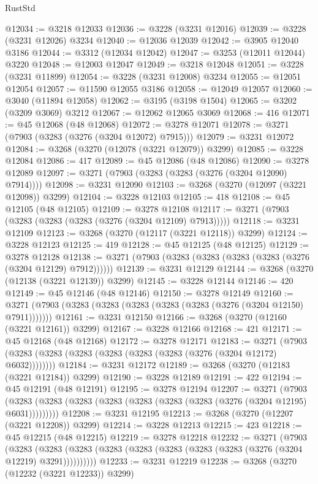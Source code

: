 \begin{lexlean}{RustStd}
\begin{coremodule}
@12034 := @3218 @12033
@12036 := @3228 (@3231 @12016)
@12039 := @3228 (@3231 @12026) @3234
@12040 := @12036 @12039
@12042 := @3905 @12040 @3186
@12044 := @3312 (@12034 @12042)
@12047 := @3253 (@12011 @12044) @3220
@12048 := @12003 @12047
@12049 := @3218 @12048
@12051 := @3228 (@3231 @11899)
@12054 := @3228 (@3231 @12008) @3234
@12055 := @12051 @12054
@12057 := @11590 @12055 @3186
@12058 := @12049 @12057
@12060 := @3040 (@11894 @12058)
@12062 := @3195 (@3198 @1504)
@12065 := @3202 (@3209 @3069) @3212
@12067 := @12062 @12065 @3069
@12068 := 416
@12071 := @45 @12068 (@48 @12068)
@12072 := @3278 @12071
@12078 := @3271 (@7903 (@3283 (@3276 (@3204 @12072) @7915)))
@12079 := @3231 @12072
@12084 := @3268 (@3270 (@12078 (@3221 @12079)) @3299)
@12085 := @3228 @12084
@12086 := 417
@12089 := @45 @12086 (@48 @12086)
@12090 := @3278 @12089
@12097 := @3271 (@7903 (@3283 (@3283 (@3276 (@3204 @12090) @7914))))
@12098 := @3231 @12090
@12103 := @3268 (@3270 (@12097 (@3221 @12098)) @3299)
@12104 := @3228 @12103
@12105 := 418
@12108 := @45 @12105 (@48 @12105)
@12109 := @3278 @12108
@12117 := @3271 (@7903 (@3283 (@3283 (@3283 (@3276 (@3204 @12109) @7913)))))
@12118 := @3231 @12109
@12123 := @3268 (@3270 (@12117 (@3221 @12118)) @3299)
@12124 := @3228 @12123
@12125 := 419
@12128 := @45 @12125 (@48 @12125)
@12129 := @3278 @12128
@12138 := @3271 (@7903 (@3283 (@3283 (@3283 (@3283 (@3276 (@3204 @12129) @7912))))))
@12139 := @3231 @12129
@12144 := @3268 (@3270 (@12138 (@3221 @12139)) @3299)
@12145 := @3228 @12144
@12146 := 420
@12149 := @45 @12146 (@48 @12146)
@12150 := @3278 @12149
@12160 := @3271 (@7903 (@3283 (@3283 (@3283 (@3283 (@3283 (@3276 (@3204 @12150) @7911)))))))
@12161 := @3231 @12150
@12166 := @3268 (@3270 (@12160 (@3221 @12161)) @3299)
@12167 := @3228 @12166
@12168 := 421
@12171 := @45 @12168 (@48 @12168)
@12172 := @3278 @12171
@12183 := @3271 (@7903 (@3283 (@3283 (@3283 (@3283 (@3283 (@3283 (@3276 (@3204 @12172) @6032))))))))
@12184 := @3231 @12172
@12189 := @3268 (@3270 (@12183 (@3221 @12184)) @3299)
@12190 := @3228 @12189
@12191 := 422
@12194 := @45 @12191 (@48 @12191)
@12195 := @3278 @12194
@12207 := @3271
    (@7903 (@3283 (@3283 (@3283 (@3283 (@3283 (@3283 (@3283 (@3276 (@3204 @12195) @6031)))))))))
@12208 := @3231 @12195
@12213 := @3268 (@3270 (@12207 (@3221 @12208)) @3299)
@12214 := @3228 @12213
@12215 := 423
@12218 := @45 @12215 (@48 @12215)
@12219 := @3278 @12218
@12232 := @3271
    (@7903
      (@3283 (@3283 (@3283 (@3283 (@3283 (@3283 (@3283 (@3283 (@3276 (@3204 @12219) @3291))))))))))
@12233 := @3231 @12219
@12238 := @3268 (@3270 (@12232 (@3221 @12233)) @3299)

\end{coremodule}
\end{lexlean}
